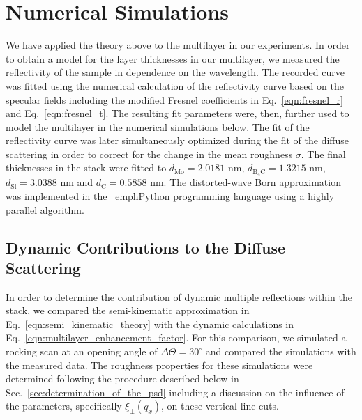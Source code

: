 \section{Numerical Simulations} \label{sec:numerical_simulations} We have applied the theory above to the multilayer in our experiments. In order to obtain a model for the layer thicknesses in our multilayer, we measured the reflectivity of the sample in dependence on the wavelength. The recorded curve was fitted using the numerical calculation of the reflectivity curve based on the specular fields including the modified Fresnel coefficients in Eq.~\eqref{eqn:fresnel_r} and Eq.~\eqref{eqn:fresnel_t}. The resulting fit parameters were, then, further used to model the multilayer in the numerical simulations below. The fit of the reflectivity curve was later simultaneously optimized during the fit of the diffuse scattering in order to correct for the change in the mean roughness $\sigma$. The final thicknesses in the stack were fitted to $d_\text{Mo} = 2.0181$ nm, $d_\text{B$_4$C} = 1.3215$ nm, $d_\text{Si} = 3.0388$ nm and $d_\text{C} = 0.5858$ nm. The distorted-wave Born approximation was implemented in the \
emph{Python} programming language using a highly parallel algorithm.

\subsection{Dynamic Contributions to the Diffuse Scattering} \label{sec:dynamic_contributions} 
In order to determine the contribution of dynamic multiple reflections within the stack, we compared the semi-kinematic approximation in Eq.~\eqref{eqn:semi_kinematic_theory} with the dynamic calculations in Eq.~\eqref{eqn:multilayer_enhancement_factor}. For this comparison, we simulated a rocking scan at an opening angle of $\Delta \Theta = 30^\circ$ and compared the simulations with the measured data. The roughness properties for these simulations were determined following the procedure described below in Sec.~\ref{sec:determination_of_the_psd} including a discussion on the influence of the parameters, specifically $\xi_\perp(q_x)$, on these vertical line cuts.

